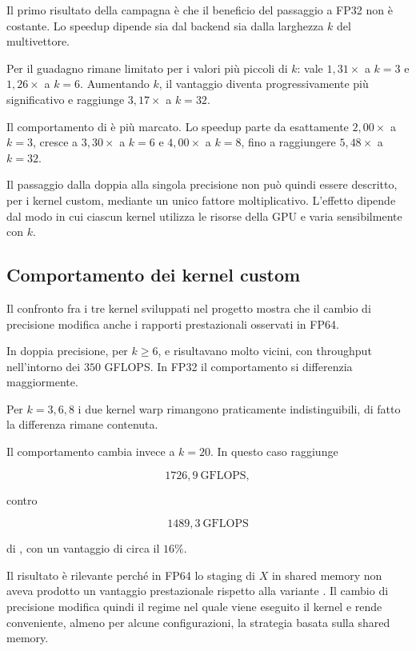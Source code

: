 Il primo risultato della campagna è che il beneficio del passaggio a FP32 non
è costante. Lo speedup dipende sia dal backend sia dalla larghezza $k$ del
multivettore.

Per  il guadagno rimane limitato per i valori più
piccoli di $k$: vale $1{,}31\times$ a $k=3$ e $1{,}26\times$ a $k=6$.
Aumentando $k$, il vantaggio diventa progressivamente più significativo e
raggiunge $3{,}17\times$ a $k=32$.

Il comportamento di  è più marcato. Lo speedup parte
da esattamente $2{,}00\times$ a $k=3$, cresce a $3{,}30\times$ a $k=6$ e
$4{,}00\times$ a $k=8$, fino a raggiungere $5{,}48\times$ a $k=32$.

Il passaggio dalla doppia alla singola precisione non può quindi essere
descritto, per i kernel custom, mediante un unico fattore moltiplicativo.
L'effetto dipende dal modo in cui ciascun kernel utilizza le risorse della GPU
e varia sensibilmente con $k$.


\subsection{Comportamento dei kernel custom}

Il confronto fra i tre kernel sviluppati nel progetto mostra che il cambio di
precisione modifica anche i rapporti prestazionali osservati in FP64.

In doppia precisione, per $k\ge6$,  e
 risultavano molto vicini, con throughput
nell'intorno dei $350$ GFLOPS. In FP32 il comportamento si differenzia
maggiormente.

Per $k=3,6,8$ i due kernel warp rimangono praticamente indistinguibili, di fatto la differenza rimane contenuta.

Il comportamento cambia invece a $k=20$. In questo caso
 raggiunge

\[
1726{,}9\ \text{GFLOPS},
\]

contro

\[
1489{,}3\ \text{GFLOPS}
\]

di , con un vantaggio di circa il $16\%$.

Il risultato è rilevante perché in FP64 lo staging di $X$ in shared memory non
aveva prodotto un vantaggio prestazionale rispetto alla variante
. Il cambio di precisione modifica quindi il regime nel
quale viene eseguito il kernel e rende conveniente, almeno per alcune
configurazioni, la strategia basata sulla shared memory.

